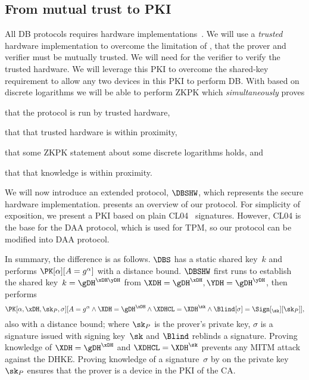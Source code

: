 \subsection{From mutual trust to \acs*{PKI}}

All \acl{DB} protocols requires hardware 
implementations~\cite{DBonSmartphones}.
We will use a \emph{trusted} hardware implementation to overcome the limitation 
of \textcite{UWBPR}, \ie that the prover and verifier must be mutually trusted.
We will need  for the verifier to verify the trusted hardware.
We will leverage this \ac{PKI} to overcome the shared-key requirement to allow 
any two devices in this \ac{PKI} to perform \acl{DB}.
With  based on discrete logarithms we will be able to perform  
\ac{ZKPK} which \emph{simultaneously} proves
\begin{enumerate*}
\item that the protocol is run by trusted hardware,
\item that that trusted hardware is within proximity,
\item that some \ac{ZKPK} statement about some discrete logarithms holds, and
\item that that knowledge is within proximity.
\end{enumerate*}

We will now introduce an extended protocol, \(\DBSHW\), which represents the 
secure hardware implementation.
 presents an overview of our protocol.
For simplicity of exposition, we present a \ac{PKI} based on plain 
CL04~\cite{CLsignatures} signatures.
However, CL04 is the base for the \ac{DAA} protocol, which is used for 
\ac{TPM}, so our protocol can be modified into  \ac{DAA} protocol.

In summary, the difference is as follows.
\(\DBS\) has a static shared key~\(k\) and performs \(
  \PK[\alpha][A = g^\alpha]
\) with a distance bound.
\(\DBSHW\) first runs  to establish the shared key~\(k =
\gDH^{\xDH \yDH}\) from \(\XDH = \gDH^{\xDH}, \YDH = \gDH^{\yDH}\), then 
performs \[
  \PK[\alpha, \xDH, \sk_P, \sigma][
    A = g^\alpha \land
    \XDH = \gDH^{\xDH} \land
    \XDHCL = \XDH^{\sk} \land
    \Blind[\sigma] = \Sign[_{\sk}][\sk_P]
  ],
\] also with a distance bound; where \(\sk_P\) is the prover's private key, 
\(\sigma\) is a signature issued with signing key~\(\sk\) and \(\Blind\) 
reblinds a signature.
Proving knowledge of \(\XDH = \gDH^{\xDH}\) and \(\XDHCL = \XDH^{\sk}\) 
prevents any \ac{MITM} attack against the \ac{DHKE}.
Proving knowledge of a signature~\(\sigma\) by  on the private 
key~\(\sk_P\) ensures that the prover is a device in the \ac{PKI} of the 
\ac{CA}.

